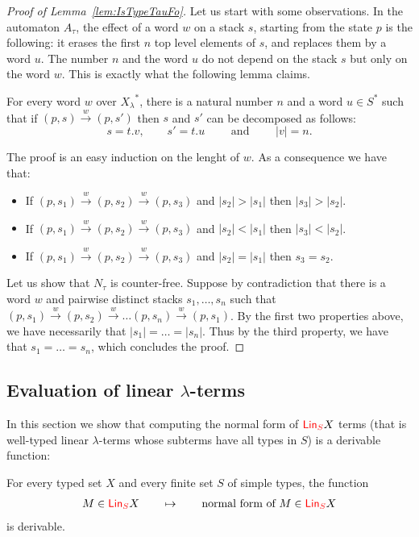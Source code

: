 \begin{proof}[Proof of Lemma~\ref{lem:IsTypeTauFo}]
Let us start with some observations. In the automaton $A_\tau$, the effect of a word $w$ on a stack $s$, starting from the state $p$ is the following: it erases the first $n$ top level elements of $s$, and replaces them by a word $u$. The number $n$ and the word $u$ do not depend on the stack $s$ but only on the word $w$. This is exactly what the following lemma claims.

\begin{lemma}
For every word $w$ over ${X_\lambda}^*$, there is a natural number $n$ and a word $u\in S^*$ such that if $(p,s)\xrightarrow{w}(p,s')$ then $s$ and $s'$ can be decomposed as follows:
$$s=t.v,\qquad s'=t.u\qquad \text{ and }\qquad |v|=n.$$
\end{lemma}
The proof is an easy induction on the lenght of $w$. As a consequence we have that:
\begin{itemize}
\item If $(p,s_1)\xrightarrow{w}(p,s_2)\xrightarrow{w}(p,s_3)$ and $|s_2|>|s_1|$ then $|s_3|>|s_2|$.
\item If $(p,s_1)\xrightarrow{w}(p,s_2)\xrightarrow{w}(p,s_3)$ and $|s_2|<|s_1|$ then $|s_3|<|s_2|$.
\item If $(p,s_1)\xrightarrow{w}(p,s_2)\xrightarrow{w}(p,s_3)$ and $|s_2|=|s_1|$ then $s_3 =s_2$.
\end{itemize}

Let us show that $N_\tau$ is counter-free. Suppose by contradiction that there is a word $w$ and pairwise distinct stacks $s_1,\dots, s_n$ such that 
$(p,s_1)\xrightarrow{w}(p,s_2)\xrightarrow{w}\dots(p,s_n)\xrightarrow{w}(p,s_1)$. By the first two properties above, we have necessarily that $|s_1|=\dots=|s_n|$. Thus by the third property, we have that $s_1=\dots=s_n$, which concludes the proof.
\end{proof}



\subsection{Evaluation of linear $\lambda$-terms}

In this section we show that computing the normal form of ${\color{red}{\mathsf{Lin}_{S}}} X$ terms (that is well-typed linear $\lambda$-terms whose subterms have all types in $S$) is a derivable function:

 \begin{proposition}\label{prop:one-register} 
    For every typed set $X$ and every finite set $S$ of simple types, the function 
    \begin{align*}
        M \in  {\color{red}{\mathsf{Lin}_{S}}} X \qquad \mapsto \qquad \text{normal form of $M$} \in  {\color{red}{\mathsf{Lin}_{S}}} X
    \end{align*}
    is derivable.
\end{proposition}

